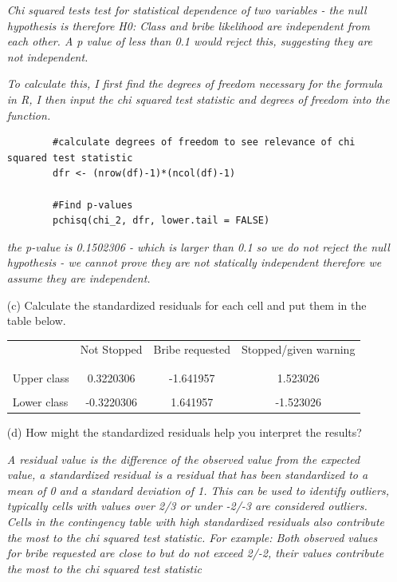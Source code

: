 \documentclass[12pt,letterpaper]{article}
\begin{document}
\begin{enumerate}
	\textit{Chi squared tests test for statistical dependence of two variables - the null hypothesis is therefore H0: Class and bribe likelihood are independent from each other. A p value of less than 0.1 would reject this, suggesting they are not independent.}
	
	\vspace{.5cm}
	\textit{To calculate this, I first find the degrees of freedom necessary for the formula in R, I then input the chi squared test statistic and degrees of freedom into the function.}
	\begin{verbatim}		
		#calculate degrees of freedom to see relevance of chi squared test statistic
		dfr <- (nrow(df)-1)*(ncol(df)-1)
		
		#Find p-values
		pchisq(chi_2, dfr, lower.tail = FALSE) 
	\end{verbatim}
	
	\vspace{.5cm}
		\textit{the p-value is 0.1502306 - which is larger than 0.1 so we do not reject the null hypothesis - we cannot prove they are not statically independent therefore we assume they are independent.}
		
	\newpage
	\item [(c)] Calculate the standardized residuals for each cell and put them in the table below.
	\vspace{1cm}
	
	\begin{table}[h]
		\centering
		\begin{tabular}{l | c c c }
			& Not Stopped & Bribe requested & Stopped/given warning \\
			\\[-1.8ex] 
			\hline \\[-1.8ex]
			Upper class & 0.3220306 & -1.641957 & 1.523026 \\
			\\
			Lower class & -0.3220306 & 1.641957 & -1.523026 \\
			
		\end{tabular}
	\end{table}
	
	
	\vspace{1cm}
	\item [(d)] How might the standardized residuals help you interpret the results? 
	
	\vspace{.5cm}
	\textit{A residual value is the difference of the observed value from the expected value, a standardized residual is a residual that has been standardized to a mean of 0 and a standard deviation of 1. This can be used to identify outliers, typically cells with values over 2/3 or under -2/-3 are considered outliers. Cells in the contingency table with high standardized residuals also contribute the most to the chi squared test statistic. For example: Both observed values for bribe requested are close to but do not exceed 2/-2, their values contribute the most to the chi squared test statistic}
	

\end{enumerate}
\end{document}
